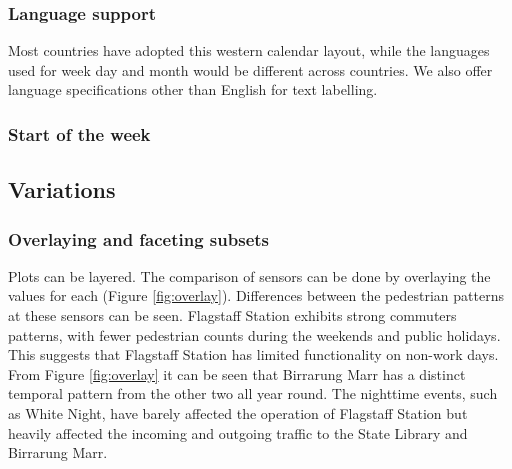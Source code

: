 \documentclass[12pt]{article}
\begin{document}
\hypertarget{language-support}{%
\subsubsection{Language support}\label{language-support}}

Most countries have adopted this western calendar layout, while the languages used for week day and month would be different across countries. We also offer language specifications other than English for text labelling.

\hypertarget{start-of-the-week}{%
\subsubsection{Start of the week}\label{start-of-the-week}}

\hypertarget{sec:variations}{%
\subsection{Variations}\label{sec:variations}}

\hypertarget{overlaying-and-faceting-subsets}{%
\subsubsection{Overlaying and faceting subsets}\label{overlaying-and-faceting-subsets}}

Plots can be layered. The comparison of sensors can be done by overlaying the values for each (Figure \ref{fig:overlay}). Differences between the pedestrian patterns at these sensors can be seen. Flagstaff Station exhibits strong commuters patterns, with fewer pedestrian counts during the weekends and public holidays. This suggests that Flagstaff Station has limited functionality on non-work days. From Figure \ref{fig:overlay} it can be seen that Birrarung Marr has a distinct temporal pattern from the other two all year round. The nighttime events, such as White Night, have barely affected the operation of Flagstaff Station but heavily affected the incoming and outgoing traffic to the State Library and Birrarung Marr.
\end{document}
